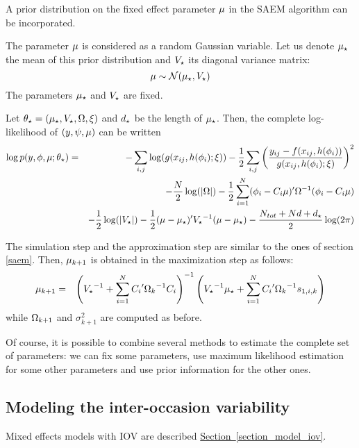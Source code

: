 A prior distribution on the fixed effect parameter
$\fixed_effect$ in the SAEM algorithm can be incorporated.

The parameter $\fixed_effect$ is considered as a random Gaussian variable. Let us denote $\meanprior$ the mean of this prior distribution and
${V_\star}$ its diagonal variance matrix:
\begin{equation} \label{prior_mu}
\fixed_effect \sim {\cal N}(\meanprior,\varprior)
\end{equation}
The parameters $\meanprior$ and ${V_\star}$ are fixed.

Let $\thetaprior = (\meanprior,\varprior,\IIV,\xi)$ and ${d_\star}$ be the length of $\meanprior$. Then, the complete log-likelihood of $(\yg,\psig,\fixed_effect)$ can be written
\begin{eqnarray*}
\log p(\yg,\phig,\mu;\thetaprior) & = &  - \sum_{i,j}\log( g(x_{ij},h(\phigi);\xi) )
-\frac{1}{2} \sum_{i,j}\left( \frac{y_{ij} - f(x_{ij},h(\phigi))}{g(x_{ij},h(\phigi);\xi) } \right)^2 \\
& & -\frac{N}{2} \log (|\IIV|)
-\frac{1}{2}\sum_{i=1}^{N}(\phigi-\magi\fixed_effect)^\prime \IIV^{-1}(\phigi-\magi\fixed_effect) \\
&&-\frac{1}{2}\log(|\varprior|)-\frac{1}{2}(\fixed_effect-\meanprior)^\prime \varprior^{-1}(\fixed_effect-\meanprior) -\frac{
N_{tot}+Nd+\dprior}{2}\log(2\pi)
\end{eqnarray*}

The simulation step and the approximation step are similar to the ones of section \ref{saem}. Then,
$\mugkun$ is obtained in the maximization step as follows:
 \begin{eqnarray*}
\mugkun &= &\left( \varprior^{-1}+\sum_{i=1}^{N}  \magi^\prime \IIVk^{-1} \magi \right)^{-1}\left(\varprior^{-1}\meanprior+
\sum_{i=1}^N \magi^\prime \IIVk ^{-1} s_{1,i,k} \right) \\
\end{eqnarray*}
while ${\Omega}_{k+1}$ and $\sigma^2_{k+1}$ are computed as before.


Of course, it is possible to combine several methods to estimate the
complete set of parameters: we can fix some parameters, use maximum
likelihood estimation for some other parameters and  use prior
information for the other ones.

\subsection{Modeling the inter-occasion variability} \label{section_methodo_iov}
Mixed effects models with IOV are described \hyperref[section_model_iov]{Section~\ref*{section_model_iov}}.

